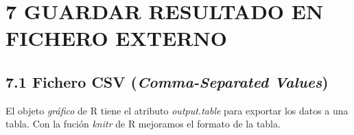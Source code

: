 \documentclass[
]{article}
\newenvironment{Shaded}{\begin{snugshade}}{\end{snugshade}}
\newcommand{\AttributeTok}[1]{\textcolor[rgb]{0.13,0.29,0.53}{#1}}
\newcommand{\CommentTok}[1]{\textcolor[rgb]{0.56,0.35,0.01}{\textit{#1}}}
\newcommand{\FunctionTok}[1]{\textcolor[rgb]{0.13,0.29,0.53}{\textbf{#1}}}
\newcommand{\NormalTok}[1]{#1}
\newcommand{\OtherTok}[1]{\textcolor[rgb]{0.56,0.35,0.01}{#1}}
\newcommand{\SpecialCharTok}[1]{\textcolor[rgb]{0.81,0.36,0.00}{\textbf{#1}}}
\newcommand{\StringTok}[1]{\textcolor[rgb]{0.31,0.60,0.02}{#1}}
\begin{document}
\hypertarget{guardar-resultado-en-fichero-externo}{%
\section{7 GUARDAR RESULTADO EN FICHERO
EXTERNO}\label{guardar-resultado-en-fichero-externo}}

\hypertarget{fichero-csv-comma-separated-values}{%
\subsection{\texorpdfstring{7.1 Fichero CSV (\emph{Comma-Separated
Values})}{7.1 Fichero CSV (Comma-Separated Values)}}\label{fichero-csv-comma-separated-values}}

El objeto \emph{gráfico} de R tiene el atributo \emph{output.table} para
exportar los datos a una tabla. Con la fución \emph{knitr} de R
mejoramos el formato de la tabla.

\begin{Shaded}
\end{Shaded}
\end{document}
